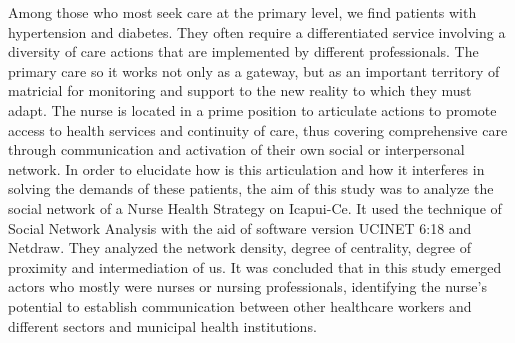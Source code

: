 Among those who most seek care at the primary level, we find patients with hypertension and diabetes. They often require a differentiated service involving a diversity of care actions that are implemented by different professionals. The primary care so it works not only as a gateway, but as an important territory of matricial for monitoring and support to the new reality to which they must adapt. The nurse is located in a prime position to articulate actions to promote access to health services and continuity of care, thus covering comprehensive care through communication and activation of their own social or interpersonal network. In order to elucidate how is this articulation and how it interferes in solving the demands of these patients, the aim of this study was to analyze the social network of a Nurse Health Strategy on Icapui-Ce. It used the technique of Social Network Analysis with the aid of software version UCINET 6:18 and Netdraw. They analyzed the network density, degree of centrality, degree of proximity and intermediation of us. It was concluded that in this study emerged actors who mostly were nurses or nursing professionals, identifying the nurse's potential to establish communication between other healthcare workers and different sectors and municipal health institutions.

